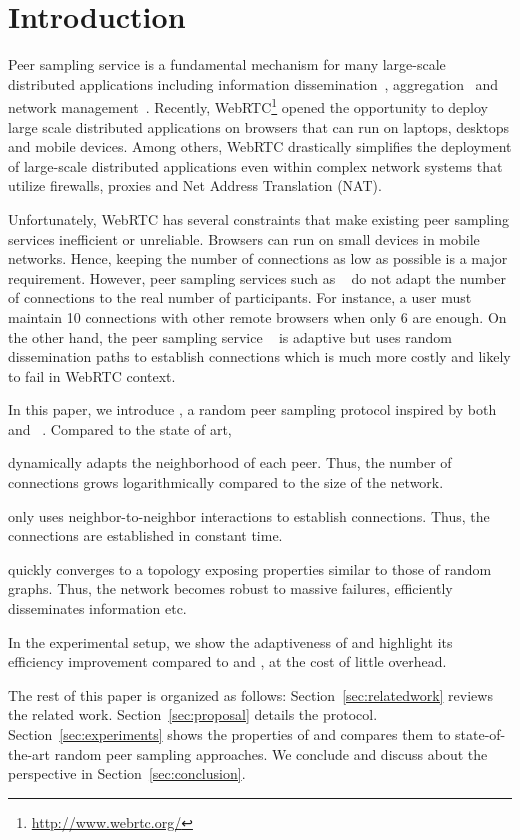 
\section{Introduction}

Peer sampling service is a fundamental mechanism for many large-scale
distributed applications including information
dissemination~\cite{eugster2003lightweight, tolgyeski2009adaptive},
aggregation~\cite{jelasity2004epidemic} and network
management~\cite{jelasity2009tman, voulgaris2005epidemic}. Recently,
WebRTC\footnote{\url{http://www.webrtc.org/}} opened the opportunity to deploy
large scale distributed applications on browsers that can run on laptops,
desktops and mobile devices. Among others, WebRTC drastically simplifies the
deployment of large-scale distributed applications even within complex network
systems that utilize firewalls, proxies and Net Address Translation (NAT).

Unfortunately, WebRTC has several constraints that make existing peer sampling
services inefficient or unreliable. Brow\-sers can run on small devices in
mobile networks. Hence, keeping the number of connections as low as possible is
a major requirement. However, peer sampling services such as
\CYCLON~\cite{voulgaris2005cyclon} do not adapt the number of connections to
the real number of participants. For instance, a user must maintain 10
connections with other remote browsers when only 6 are enough. On the other
hand, the peer sampling service \SCAMP~\cite{ganesh2003peer} is adaptive but
uses random dissemination paths to establish connections which is much more
costly and likely to fail in WebRTC context.

In this paper, we introduce \SPRAY, a random peer sampling protocol inspired by
both \SCAMP~\cite{ganesh2003peer}
and \CYCLON~\cite{voulgaris2005cyclon}. Compared to the state of art,
\begin{inparaenum}[(i)]
\item \SPRAY dynamically adapts the neighborhood of each peer. Thus, the number
  of connections grows logarithmically compared to the size of the network.
\item \SPRAY only uses neighbor-to-neighbor interactions to establish
  connections. Thus, the connections are established in constant time.
\item \SPRAY quickly converges to a topology exposing properties similar to
  those of random graphs. Thus, the network becomes robust to massive failures,
  efficiently disseminates information etc.
\item In the experimental setup, we show the adaptiveness of \SPRAY and
  highlight its efficiency improvement compared to \CYCLON and \SCAMP, at the
  cost of little overhead.
\end{inparaenum}

The rest of this paper is organized as follows: Section~\ref{sec:relatedwork}
reviews the related work. Section~\ref{sec:proposal} details the \SPRAY
protocol. Section~\ref{sec:experiments} shows the properties of \SPRAY
and compares them to state-of-the-art random peer sampling approaches. We
conclude and discuss about the perspective in Section~\ref{sec:conclusion}.

